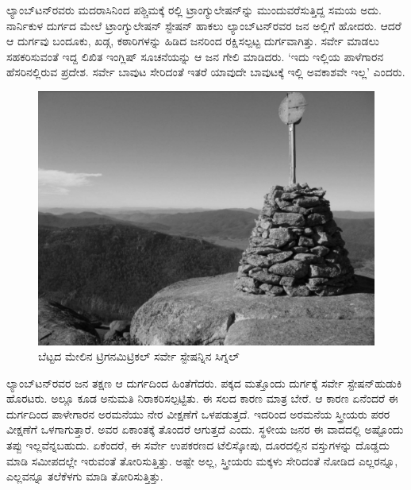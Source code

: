 ಲ್ಯಾಂಬ್​ಟನ್​ರವರು ಮದರಾಸಿನಿಂದ ಪಶ್ಚಿಮಕ್ಕೆ ರಲ್ಲಿ ಟ್ರಾಂಗ್ಯುಲೇಷನ್​ನ್ನು ಮುಂದುವರೆಸುತ್ತಿದ್ದ ಸಮಯ ಅದು. ನಾರ್ನಿಕುಳ ದುರ್ಗದ ಮೇಲೆ ಟ್ರಾಂಗ್ಯುಲೇಷನ್​ ಸ್ಟೇಷನ್​ ಹಾಕಲು ಲ್ಯಾಂಬ್​ಟನ್​ರವರ ಜನ ಅಲ್ಲಿಗೆ ಹೋದರು. ಆದರೆ ಆ ದುರ್ಗವು ಬಂದೂಕು, ಖಡ್ಗ, ಕಠಾರಿಗಳನ್ನು ಹಿಡಿದ ಜನರಿಂದ ರಕ್ಷಿಸಲ್ಪಟ್ಟ ದುರ್ಗವಾಗಿತ್ತು. ಸರ್ವೇ ಮಾಡಲು ಸಹಕರಿಸುವಂತೆ ಇದ್ದ ಲಿಖಿತ ಇಂಗ್ಲಿಷ್​ ಸೂಚನೆಯನ್ನು ಆ ಜನ ಗೇಲಿ ಮಾಡಿದರು. ‘ಇದು ಇಲ್ಲಿಯ ಪಾಳೆಗಾರನ ಹೆಸರಿನಲ್ಲಿರುವ ಪ್ರದೇಶ. ಸರ್ವೇ ಬಾವುಟ ಸೇರಿದಂತೆ ಇತರೆ ಯಾವುದೇ ಬಾವುಟಕ್ಕೆ ಇಲ್ಲಿ ಅವಕಾಶವೇ ಇಲ್ಲ’ ಎಂದರು.

\begin{figure}[!htbp]
\includegraphics[scale=.85]{"images/image016.jpg"}
\caption{ಬೆಟ್ಟದ ಮೇಲಿನ ಟ್ರಿಗನಮಿಟ್ರಿಕಲ್​ ಸರ್ವೇ ಸ್ಟೇಷನ್ನಿನ ಸಿಗ್ನಲ್​}\label{art12-fig1}
\end{figure}

ಲ್ಯಾಂಬ್​ಟನ್​ರವರ ಜನ ತಕ್ಷಣ ಆ ದುರ್ಗದಿಂದ ಹಿಂತೆಗೆದರು. ಪಕ್ಕದ ಮತ್ತೊಂದು ದುರ್ಗಕ್ಕೆ ಸರ್ವೇ ಸ್ಟೇಷನ್​ ಹುಡುಕಿ ಹೊರಟರು. ಅಲ್ಲೂ ಕೂಡ ಅನುಮತಿ ನಿರಾಕರಿಸಲ್ಪಟ್ಟಿತು. ಈ ಸಲದ ಕಾರಣ ಮಾತ್ರ ಬೇರೆ. ಆ ಕಾರಣ ಏನೆಂದರೆ ಈ ದುರ್ಗದಿಂದ ಪಾಳೇಗಾರನ ಅರಮನೆಯು ನೇರ ವೀಕ್ಷಣೆಗೆ ಒಳಪಡುತ್ತದೆ. ಇದರಿಂದ ಅರಮನೆಯ ಸ್ತ್ರೀಯರು ಪರರ ವೀಕ್ಷಣೆಗೆ ಒಳಗಾಗುತ್ತಾರೆ. ಅವರ ಏಕಾಂತಕ್ಕೆ ತೊಂದರೆ ಆಗುತ್ತದೆ ಎಂದು. ಸ್ಥಳೀಯ ಜನರ ಈ ವಾದದಲ್ಲಿ ಅಷ್ಟೊಂದು ತಪ್ಪು ಇಲ್ಲವೆನ್ನಬಹುದು. ಏಕೆಂದರೆ, ಈ ಸರ್ವೇ ಉಪಕರಣದ ಟೆಲಿಸ್ಕೋಪು, ದೂರದಲ್ಲಿನ ವಸ್ತುಗಳನ್ನು ದೊಡ್ಡದು ಮಾಡಿ ಸಮೀಪದಲ್ಲೇ ಇರುವಂತೆ ತೋರಿಸುತ್ತಿತ್ತು. ಅಷ್ಟೇ ಅಲ್ಲ, ಸ್ತ್ರೀಯರು ಮಕ್ಕಳು ಸೇರಿದಂತೆ ನೋಡಿದ ಎಲ್ಲರನ್ನೂ, ಎಲ್ಲವನ್ನೂ ತಲೆಕೆಳಗು ಮಾಡಿ ತೋರಿಸುತ್ತಿತ್ತು.

